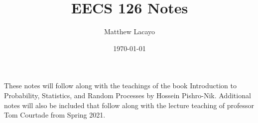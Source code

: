 \documentclass[11pt, oneside]{article}   	%
\theoremstyle{definition}
\begin{document}
\title{EECS 126 Notes}
\author{Matthew Lacayo}
\date{\today}
\maketitle
These notes will follow along with the teachings of the book Introduction to Probability, Statistics, and Random Processes by Hossein Pishro-Nik. Additional notes will also be included that follow along with the lecture teaching of professor Tom Courtade from Spring 2021.
\tableofcontents

\newpage


\newpage 


\newpage 


\newpage 

\end{document}
